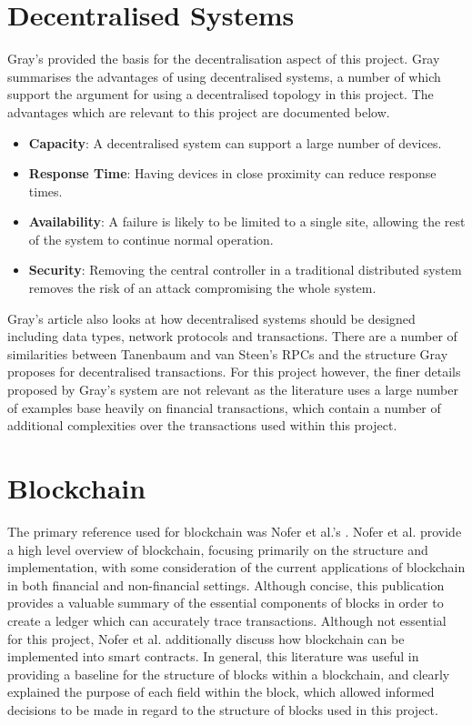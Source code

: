 \documentclass[a4paper, 11pt]{report}
\begin{document}
\section{Decentralised Systems} \label{decentrailsed}
Gray's  \cite{decentralised} provided the basis for the decentralisation aspect of this project. Gray summarises the advantages of using decentralised systems, a number of which support the argument for using a decentralised topology in this project. The advantages which are relevant to this project are documented below.

\begin{itemize}
    \item \textbf{Capacity}: A decentralised system can support a large number of devices.
    \item \textbf{Response Time}: Having devices in close proximity can reduce response times.
    \item \textbf{Availability}: A failure is likely to be limited to a single site, allowing the rest of the system to continue normal operation.
    \item \textbf{Security}: Removing the central controller in a traditional distributed system removes the risk of an attack compromising the whole system.
\end{itemize}

Gray's article also looks at how decentralised systems should be designed including data types, network protocols and transactions. There are a number of similarities between Tanenbaum and van Steen's \acrshort{RPC}s and the structure Gray proposes for decentralised transactions. For this project however, the finer details proposed by Gray's system are not relevant as the literature uses a large number of examples base heavily on financial transactions, which contain a number of additional complexities over the transactions used within this project.


\section{Blockchain}
The primary reference used for \gls{blockchain} was Nofer et al.'s \cite{blockchain}. Nofer et al. provide a high level overview of \gls{blockchain}, focusing primarily on the structure and implementation, with some consideration of the current applications of \gls{blockchain} in both financial and non-financial settings. Although concise, this publication provides a valuable summary of the essential components of blocks in order to create a ledger which can accurately trace transactions. Although not essential for this project, Nofer et al. additionally discuss how \gls{blockchain} can be implemented into smart contracts. In general, this literature was useful in providing a baseline for the structure of blocks within a \gls{blockchain}, and clearly explained the purpose of each field within the block, which allowed informed decisions to be made in regard to the structure of blocks used in this project. 
\end{document}
